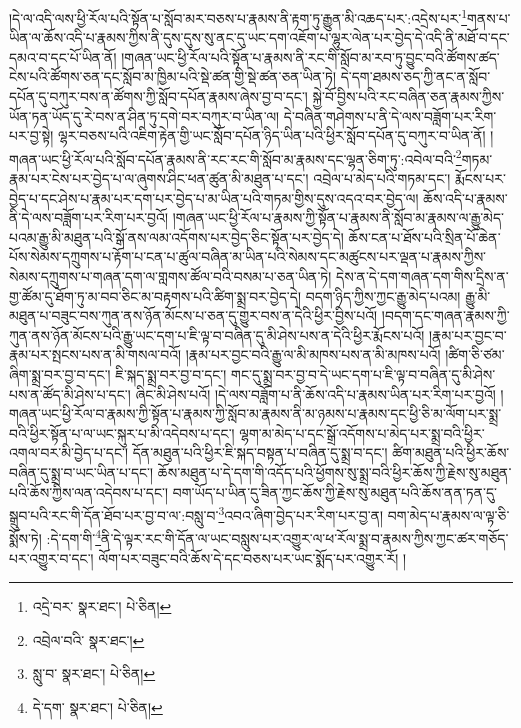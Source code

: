 །དེ་ལ་འདི་ལས་ཕྱི་རོལ་པའི་སྟོན་པ་སློབ་མར་བཅས་པ་རྣམས་ནི་རྟག་ཏུ་རྒྱུན་མི་འཆད་པར་:འདྲེས་པར་\footnote{འདྲེ་བར་  སྣར་ཐང་།  པེ་ཅིན། }གནས་པ་ཡིན་ལ་ཆོས་འདི་པ་རྣམས་ཀྱིས་ནི་དུས་དུས་སུ་ནང་དུ་ཡང་དག་འཇོག་པ་ལྷུར་ལེན་པར་བྱེད་དེ་འདི་ནི་མཐོ་བ་དང་དམའ་བ་དང་པོ་ཡིན་ནོ། །གཞན་ཡང་ཕྱི་རོལ་པའི་སྟོན་པ་རྣམས་ནི་རང་གི་སློབ་མ་རབ་ཏུ་བྱུང་བའི་ཚོགས་ཚད་ངེས་པའི་ཚོགས་ཅན་དང་སློབ་མ་ཁྱིམ་པའི་སྡེ་ཚན་གྱི་སྡེ་ཚན་ཅན་ཡིན་ཏེ། དེ་དག་ཐམས་ཅད་ཀྱི་ནང་ན་སློབ་དཔོན་དུ་བཀུར་བས་ན་ཚོགས་ཀྱི་སློབ་དཔོན་རྣམས་ཞེས་བྱ་བ་དང་། སྐྱེ་བོ་བྱིས་པའི་རང་བཞིན་ཅན་རྣམས་ཀྱིས་ཡོན་ཏན་ཡོད་དུ་རེ་བས་ན་ཤིན་ཏུ་དགེ་བར་བཀུར་བ་ཡིན་ལ། དེ་བཞིན་གཤེགས་པ་ནི་དེ་ལས་བཟློག་པར་རིག་པར་བྱ་སྟེ། ལྷར་བཅས་པའི་འཇིག་རྟེན་གྱི་ཡང་སློབ་དཔོན་ཉིད་ཡིན་པའི་ཕྱིར་སློབ་དཔོན་དུ་བཀུར་བ་ཡིན་ནོ། །གཞན་ཡང་ཕྱི་རོལ་པའི་སློབ་དཔོན་རྣམས་ནི་རང་རང་གི་སློབ་མ་རྣམས་དང་ལྷན་ཅིག་ཏུ་:འབེལ་བའི་\footnote{འབྲེལ་བའི་  སྣར་ཐང་། }གཏམ་རྣམ་པར་ངེས་པར་བྱེད་པ་ལ་ཞུགས་ཤིང་ཕན་ཚུན་མི་མཐུན་པ་དང་། འབྲེལ་པ་མེད་པའི་གཏམ་དང་། རྨོངས་པར་བྱེད་པ་དང་ཤེས་པ་རྣམ་པར་དག་པར་བྱེད་པ་མ་ཡིན་པའི་གཏམ་གྱིས་དུས་འདའ་བར་བྱེད་ལ། ཆོས་འདི་པ་རྣམས་ནི་དེ་ལས་བཟློག་པར་རིག་པར་བྱའོ། །གཞན་ཡང་ཕྱི་རོལ་པ་རྣམས་ཀྱི་སྟོན་པ་རྣམས་ནི་སློབ་མ་རྣམས་ལ་རྒྱུ་མེད་པའམ་རྒྱུ་མི་མཐུན་པའི་སྒོ་ནས་ལམ་འདོགས་པར་བྱེད་ཅིང་སྟོན་པར་བྱེད་དེ། ཆོས་ངན་པ་ཐོས་པའི་སྲིན་པོ་ཆེན་པོས་སེམས་དཀྲུགས་པ་རྟོག་པ་ངན་པ་ཚུལ་བཞིན་མ་ཡིན་པའི་སེམས་དང་མཚུངས་པར་ལྡན་པ་རྣམས་ཀྱིས་སེམས་དཀྲུགས་པ་གཞན་དག་ལ་གླགས་ཚོལ་བའི་བསམ་པ་ཅན་ཡིན་ཏེ། དེས་ན་དེ་དག་གཞན་དག་གིས་དྲིས་ན་གྱ་ཚོམ་དུ་ཐོག་ཏུ་མ་བབ་ཅིང་མ་བརྟགས་པའི་ཚིག་སྨྲ་བར་བྱེད་དེ། བདག་ཉིད་ཀྱིས་ཀྱང་རྒྱུ་མེད་པའམ། རྒྱུ་མི་མཐུན་པ་བཟུང་བས་ཀུན་ནས་ཉོན་མོངས་པ་ཅན་དུ་གྱུར་བས་ན་དེའི་ཕྱིར་བྱིས་པའོ། །བདག་དང་གཞན་རྣམས་ཀྱི་ཀུན་ནས་ཉོན་མོངས་པའི་རྒྱུ་ཡང་དག་པ་ཇི་ལྟ་བ་བཞིན་དུ་མི་ཤེས་པས་ན་དེའི་ཕྱིར་རྨོངས་པའོ། །རྣམ་པར་བྱང་བ་རྣམ་པར་སྤངས་པས་ན་མི་གསལ་བའོ། །རྣམ་པར་བྱང་བའི་རྒྱུ་ལ་མི་མཁས་པས་ན་མི་མཁས་པའོ། །ཚིག་ཅི་ཙམ་ཞིག་སྨྲ་བར་བྱ་བ་དང་། ཇི་སྐད་སྨྲ་བར་བྱ་བ་དང་། གང་དུ་སྨྲ་བར་བྱ་བ་དེ་ཡང་དག་པ་ཇི་ལྟ་བ་བཞིན་དུ་མི་ཤེས་པས་ན་ཚོད་མི་ཤེས་པ་དང་། ཞིང་མི་ཤེས་པའོ། །དེ་ལས་བཟློག་པ་ནི་ཆོས་འདི་པ་རྣམས་ཡིན་པར་རིག་པར་བྱའོ། །གཞན་ཡང་ཕྱི་རོལ་བ་རྣམས་ཀྱི་སྟོན་པ་རྣམས་ཀྱི་སློབ་མ་རྣམས་ནི་མ་ཉམས་པ་རྣམས་དང་ཕྱི་ཅི་མ་ལོག་པར་སྨྲ་བའི་ཕྱིར་སྟོན་པ་ལ་ཡང་སྐུར་པ་མི་འདེབས་པ་དང་། ལྷག་མ་མེད་པ་དང་སྒྲོ་འདོགས་པ་མེད་པར་སྨྲ་བའི་ཕྱིར་འགལ་བར་མི་བྱེད་པ་དང་། དོན་མཐུན་པའི་ཕྱིར་ཇི་སྐད་བསྟན་པ་བཞིན་དུ་སྨྲ་བ་དང་། ཚིག་མཐུན་པའི་ཕྱིར་ཆོས་བཞིན་དུ་སྨྲ་བ་ཡང་ཡིན་པ་དང་། ཆོས་མཐུན་པ་དེ་དག་གི་འདོད་པའི་ཕྱོགས་སུ་སྨྲ་བའི་ཕྱིར་ཆོས་ཀྱི་རྗེས་སུ་མཐུན་པའི་ཆོས་ཀྱིས་ལན་འདེབས་པ་དང་། བག་ཡོད་པ་ཡིན་དུ་ཟིན་ཀྱང་ཆོས་ཀྱི་རྗེས་སུ་མཐུན་པའི་ཆོས་ནན་ཏན་དུ་སྒྲུབ་པའི་རང་གི་དོན་ཐོབ་པར་བྱ་བ་ལ་:བསླུ་བ་\footnote{སླུ་བ་  སྣར་ཐང་།  པེ་ཅིན། }འབའ་ཞིག་བྱེད་པར་རིག་པར་བྱ་ན། བག་མེད་པ་རྣམས་ལ་ལྟ་ཅི་སྨོས་ཏེ། :དེ་དག་གི་\footnote{དེ་དག་  སྣར་ཐང་།  པེ་ཅིན། }ནི་དེ་ལྟར་རང་གི་དོན་ལ་ཡང་བསླུས་པར་འགྱུར་ལ་ཕ་རོལ་སྨྲ་བ་རྣམས་ཀྱིས་ཀྱང་ཚར་གཅོད་པར་འགྱུར་བ་དང་། ལོག་པར་བཟུང་བའི་ཆོས་དེ་དང་བཅས་པར་ཡང་སྨོད་པར་འགྱུར་རོ། །
